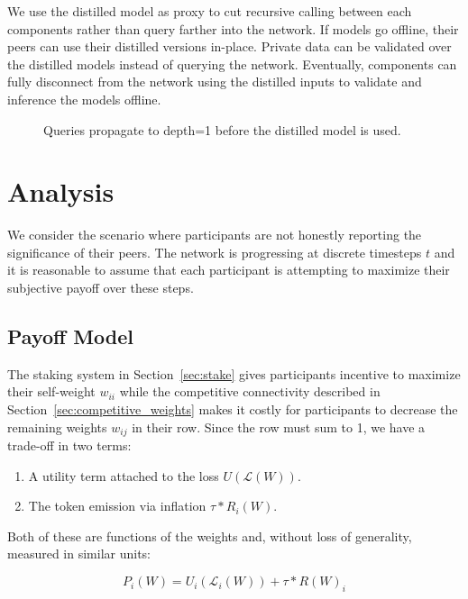\documentclass{article}
\begin{document}
We use the distilled model as proxy to cut recursive calling between each components rather than query farther into the network. If models go offline, their peers can use their distilled versions in-place. Private data can be validated over the distilled models instead of querying the network. Eventually, components can fully disconnect from the network using the distilled inputs to validate and inference the models offline.
\smallskip

\begin{figure}[H]
	\centering
	\hspace*{0cm}
	
	\caption{Queries propagate to depth=1 before the distilled model is used.}
\end{figure}{}

\section{Analysis}
\label{analysis}

We consider the scenario where participants are not honestly reporting the significance of their peers. The network is progressing at discrete timesteps $t$ and it is reasonable to assume that each participant is attempting to maximize their subjective payoff over these steps.

\subsection{Payoff Model}

The staking system in Section~\ref{sec:stake} gives participants incentive to maximize their self-weight $w_{ii}$ while the competitive connectivity described in Section~\ref{sec:competitive_weights} makes it costly for participants to decrease the remaining weights $w_{ij}$ in their row. Since the row must sum to 1, we have a trade-off in two terms:

\begin{enumerate}
	\item A utility term attached to the loss $U(\mathcal{L}(W))$.
	\item The token emission via inflation $\tau * R_i(W)$. 
\end{enumerate}

Both of these are functions of the weights and, without loss of generality, measured in similar units:
\bigskip

\begin{equation}
P_i (W) = U_i(\mathcal{L}_i(W)) + \tau * R(W)_i
\end{equation}
\smallskip
\end{document}
